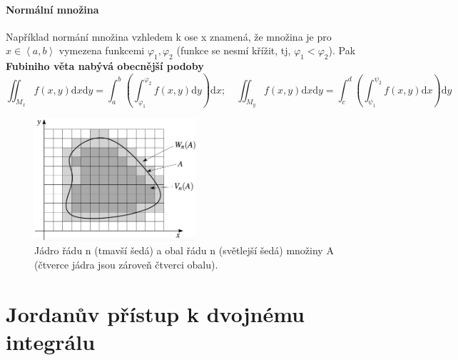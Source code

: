 \documentclass[a4paper, twoside,%
12pt]{article}
\newcommand{\dif}{\mathrm{d}}
\begin{document}
\paragraph{Normální množina} Například normání množina vzhledem k ose x znamená, že množina je pro $x\in\left< a,b\right>$ vymezena funkcemi $\varphi_1, \varphi_2$ (funkce se nesmí křížit, tj, $\varphi_1<\varphi_2$). Pak \textbf{Fubiniho věta nabývá obecnější podoby}
$$ \iint_{M_x} f(x,y)\dif x\dif y = \int_a^b \left( \int_{\varphi_1}^{\varphi_2} f(x,y) \dif y\right) \dif x;  \quad \iint_{M_y} f(x,y)\dif x\dif y = \int_c^d \left( \int_{\psi_1}^{\psi_2} f(x,y) \dif x\right) \dif y $$

\begin{figure}[h]
    \centering
    \includegraphics[width=6cm]{jordan_sit.png}
    \caption{Jádro řádu n (tmavší šedá) a obal řádu n (světlejší šedá) množiny A (čtverce jádra jsou zároveň čtverci obalu).}
    \label{fig:jordan}
\end{figure}

\section{Jordanův přístup k dvojnému integrálu}
\end{document}
